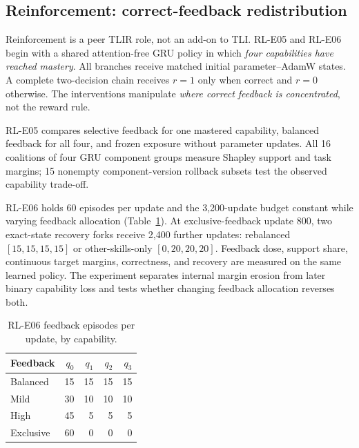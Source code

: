 \documentclass[conference,10pt]{IEEEtran}
\begin{document}
\subsection{Reinforcement: correct-feedback redistribution}
Reinforcement is a peer TLIR role, not an add-on to TLI. RL-E05 and RL-E06 begin with a shared attention-free GRU policy in which \emph{four capabilities have reached mastery}. All branches receive matched initial parameter--AdamW states. A complete two-decision chain receives $r=1$ only when correct and $r=0$ otherwise. The interventions manipulate \emph{where correct feedback is concentrated}, not the reward rule.

RL-E05 compares selective feedback for one mastered capability, balanced feedback for all four, and frozen exposure without parameter updates. All 16 coalitions of four GRU component groups measure Shapley support and task margins; 15 nonempty component-version rollback subsets test the observed capability trade-off.

RL-E06 holds 60 episodes per update and the 3,200-update budget constant while varying feedback allocation (Table~\ref{tab:dose}). At exclusive-feedback update 800, two exact-state recovery forks receive 2,400 further updates: rebalanced $[15,15,15,15]$ or other-skills-only $[0,20,20,20]$. Feedback dose, support share, continuous target margins, correctness, and recovery are measured on the same learned policy. The experiment separates internal margin erosion from later binary capability loss and tests whether changing feedback allocation reverses both.
\begin{table}[t]
\caption{RL-E06 feedback episodes per update, by capability.}
\label{tab:dose}\centering\scriptsize\setlength{\tabcolsep}{4.1pt}\renewcommand{\arraystretch}{1.08}
\begin{tabular}{@{}lrrrr@{}}\toprule
Feedback & $q_0$ & $q_1$ & $q_2$ & $q_3$\\\midrule
Balanced & 15 & 15 & 15 & 15\\
Mild & 30 & 10 & 10 & 10\\
High & 45 & 5 & 5 & 5\\
Exclusive & 60 & 0 & 0 & 0\\\bottomrule
\end{tabular}
\end{table}
\end{document}
